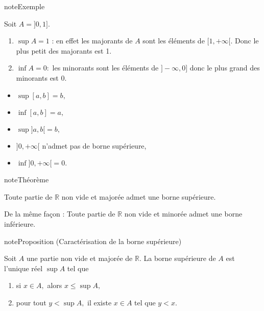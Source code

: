 \documentclass[letterpaper,10pt,french]{jupyterBook}
\begin{document}
\begin{sphinxadmonition}{note}{Exemple}

\sphinxAtStartPar
Soit \(A =]0,1].\)
\begin{enumerate}
%
\item {} 
\sphinxAtStartPar
\(\sup A = 1\) : en effet les majorants de \(A\) sont les éléments de \([1,+\infty[.\) Donc le plus petit des majorants est 1.

\item {} 
\sphinxAtStartPar
\(\inf A = 0:\) les minorants sont les éléments de \(] −\infty,0]\) donc le plus grand des minorants est 0.

\end{enumerate}
\begin{itemize}
\item {} 
\sphinxAtStartPar
\(\sup[a, b] = b,\)

\item {} 
\sphinxAtStartPar
\(\inf[a, b]=a,\)

\item {} 
\sphinxAtStartPar
\(\sup]a, b[= b,\)

\item {} 
\sphinxAtStartPar
\(]0,+\infty[\) n’admet pas de borne supérieure,

\item {} 
\sphinxAtStartPar
\(\inf]0,+\infty[= 0.\)

\end{itemize}
\end{sphinxadmonition}

\begin{sphinxadmonition}{note}{Théorème}

\sphinxAtStartPar
Toute partie de \(\mathbb{R}\) non vide et majorée admet une borne supérieure.
\end{sphinxadmonition}

\sphinxAtStartPar
De la même façon : Toute partie de \(\mathbb{R}\) non vide et minorée admet une borne inférieure.

\begin{sphinxadmonition}{note}{Proposition (Caractérisation de la borne supérieure)}

\sphinxAtStartPar
Soit \(A\) une partie non vide et majorée de \(\mathbb{R}.\) La borne supérieure de \(A\) est l’unique réel \(\sup A\) tel que
\begin{enumerate}
%
\item {} 
\sphinxAtStartPar
si \(x\in A,\) alors \(x \leqslant\sup A,\)

\item {} 
\sphinxAtStartPar
pour tout \(y < \sup A,\) il existe \(x\in A\) tel que \(y < x.\)

\end{enumerate}
\end{sphinxadmonition}
\end{document}
